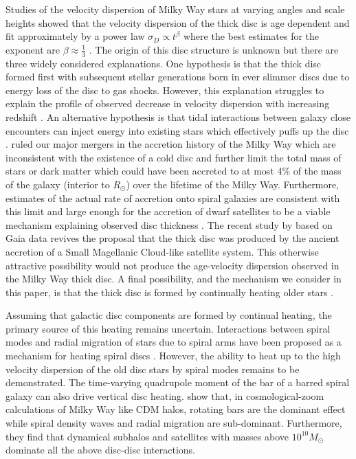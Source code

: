 \documentclass[usenatbib]{mnras}
\begin{document}
Studies of the velocity dispersion of Milky Way stars at varying angles and scale heights showed that the velocity dispersion of the thick disc is age dependent and fit approximately by a power law $\sigma_D \propto t^{\beta}$ where the best estimates for the exponent are $\beta \approx \frac{1}{3}$ \citep{heating_history}. The origin of this disc structure is unknown but there are three widely considered explanations. One hypothesis is that the thick disc formed first with subsequent stellar generations born in ever slimmer discs due to energy loss of the disc to gas shocks. However, this explanation struggles to explain the profile of observed decrease in velocity dispersion with increasing redshift \citep{emergence-thick-disc}. An alternative hypothesis is that tidal interactions between galaxy close encounters can inject energy into existing stars which effectively puffs up the disc \citep{thick-disc-mergers}. \cite{mergers} ruled our major mergers in the accretion history of the Milky Way which are inconsistent with the existence of a cold disc and further limit the total mass of stars or dark matter which could have been accreted to at most 4\% of the mass of the galaxy (interior to $R_{\odot}$) over the lifetime of the Milky Way. Furthermore, estimates of the actual rate of accretion onto spiral galaxies are consistent with this limit and large enough for the accretion of dwarf satellites to be a viable mechanism explaining observed disc thickness \citep{mergers}.
The recent study by \cite{gaia_normal_process} based on Gaia data revives the proposal that the thick disc was produced by the ancient accretion of a Small Magellanic Cloud-like satellite system. This otherwise attractive possibility would not produce the age-velocity dispersion observed in the Milky Way thick disc. 
A final possibility, and the mechanism we consider in this paper, is that the thick disc is formed by continually heating older stars \citep{thin-and-thick-disc}. 
\par 
Assuming that galactic disc components are formed by continual heating, the primary source of this heating remains uncertain. Interactions between spiral modes and radial migration of stars due to spiral arms have been proposed as a mechanism for heating spiral discs \citep{radial_migration}. However, the ability to heat up to the high velocity dispersion of the old disc stars by spiral modes remains to be demonstrated. The time-varying quadrupole moment of the bar of a barred spiral galaxy can also drive vertical disc heating. \cite{vertical_heating_modes} show that, in cosmological-zoom calculations of Milky Way like CDM halos, rotating bars are the dominant effect while spiral density waves and radial migration are sub-dominant. Furthermore, they find that dynamical subhalos and satellites with masses above $10^{10} M_{\odot}$ dominate all the above disc-disc interactions. 
\end{document}
